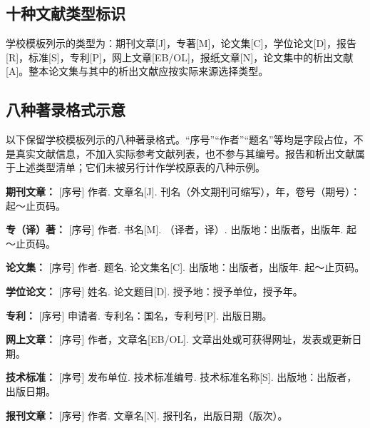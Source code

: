 \subsection{十种文献类型标识}

学校模板列示的类型为：期刊文章[J]，专著[M]，论文集[C]，学位论文[D]，报告[R]，标准[S]，专利[P]，网上文章[EB/OL]，报纸文章[N]，论文集中的析出文献[A]。整本论文集与其中的析出文献应按实际来源选择类型。

\subsection{八种著录格式示意}

以下保留学校模板列示的八种著录格式。“序号”“作者”“题名”等均是字段占位，不是真实文献信息，不加入实际参考文献列表，也不参与其编号。报告和析出文献属于上述类型清单；它们未被另行计作学校原表的八种示例。

\noindent\textbf{期刊文章：} [序号] 作者. 文章名[J]. 刊名（外文期刊可缩写），年，卷号（期号）：起～止页码。

\noindent\textbf{专（译）著：} [序号] 作者. 书名[M]. （译者，译）. 出版地：出版者，出版年. 起～止页码。

\noindent\textbf{论文集：} [序号] 作者. 题名. 论文集名[C]. 出版地：出版者，出版年. 起～止页码。

\noindent\textbf{学位论文：} [序号] 姓名. 论文题目[D]. 授予地：授予单位，授予年。

\noindent\textbf{专利：} [序号] 申请者. 专利名：国名，专利号[P]. 出版日期。

\noindent\textbf{网上文章：} [序号] 作者，文章名[EB/OL]. 文章出处或可获得网址，发表或更新日期。

\noindent\textbf{技术标准：} [序号] 发布单位. 技术标准编号. 技术标准名称[S]. 出版地：出版者，出版日期。

\noindent\textbf{报刊文章：} [序号] 作者. 文章名[N]. 报刊名，出版日期（版次）。
